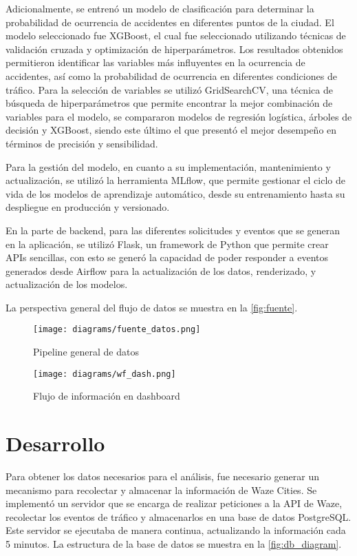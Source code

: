 \documentclass[12pt]{article}
\begin{document}
Adicionalmente, se entrenó un modelo de clasificación para determinar la probabilidad de ocurrencia de accidentes en diferentes puntos de la ciudad. El modelo seleccionado fue XGBoost, el cual fue seleccionado utilizando técnicas de validación cruzada y optimización de hiperparámetros. Los resultados obtenidos permitieron identificar las variables más influyentes en la ocurrencia de accidentes, así como la probabilidad de ocurrencia en diferentes condiciones de tráfico. Para la selección de variables se utilizó GridSearchCV, una técnica de búsqueda de hiperparámetros que permite encontrar la mejor combinación de variables para el modelo, se compararon modelos de regresión logística, árboles de decisión y XGBoost, siendo este último el que presentó el mejor desempeño en términos de precisión y sensibilidad.

Para la gestión del modelo, en cuanto a su implementación, mantenimiento y actualización, se utilizó la herramienta MLflow, que permite gestionar el ciclo de vida de los modelos de aprendizaje automático, desde su entrenamiento hasta su despliegue en producción y versionado.

En la parte de backend, para las diferentes solicitudes y eventos que se generan en la aplicación, se utilizó Flask, un framework de Python que permite crear APIs sencillas, con esto se generó la capacidad de poder responder a eventos generados desde Airflow para la actualización de los datos, renderizado, y actualización de los modelos.

La perspectiva general del flujo de datos se muestra en la \autoref{fig:fuente}.

\begin{figure}[h]
    \centering
    \texttt{[image: diagrams/fuente\_datos.png]}
    \caption{Pipeline general de datos}
    \label{fig:fuente}
\end{figure}

\begin{figure}[h]
    \centering
    \texttt{[image: diagrams/wf\_dash.png]}
    \caption{Flujo de información en dashboard}
    \label{fig:wf_dash}
\end{figure}

\section{Desarrollo}

Para obtener los datos necesarios para el análisis, fue necesario generar un mecanismo para recolectar y almacenar la información de Waze Cities. Se implementó un servidor que se encarga de realizar peticiones a la API de Waze, recolectar los eventos de tráfico y almacenarlos en una base de datos PostgreSQL. Este servidor se ejecutaba de manera continua, actualizando la información cada 5 minutos. La estructura de la base de datos se muestra en la \autoref{fig:db_diagram}.
\end{document}
